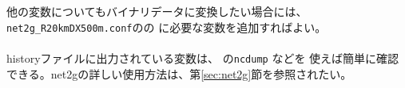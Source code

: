 他の変数についてもバイナリデータに変換したい場合には、
\verb|net2g_R20kmDX500m.conf|のの に必要な変数を追加すればよい。\\

\\

\noindent
historyファイルに出力されている変数は、{\netcdf} の\verb|ncdump| などを
使えば簡単に確認できる。net2gの詳しい使用方法は、第\ref{sec:net2g}節を参照されたい。




